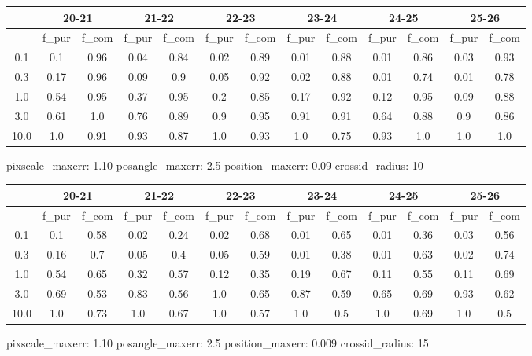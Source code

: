 \documentclass{article}
\begin{document}
\begin{figure}[H]
\centering
\begin{tabular}{|c|c|c|c|c|c|c|c|c|c|c|c|c|}
\hline
\multicolumn{1}{|c|}{} & \multicolumn{2}{|c|}{20-21} & \multicolumn{2}{|c|}{21-22} & \multicolumn{2}{|c|}{22-23} & \multicolumn{2}{|c|}{23-24} & \multicolumn{2}{|c|}{24-25} & \multicolumn{2}{|c|}{25-26}\\
\hline \hline
 & f\_pur & f\_com & f\_pur & f\_com & f\_pur & f\_com & f\_pur & f\_com & f\_pur & f\_com & f\_pur & f\_com \\
\hline
0.1 & 0.1 & 0.96 & 0.04 & 0.84 & 0.02 & 0.89 & 0.01 & 0.88 & 0.01 & 0.86 & 0.03 & 0.93\\
\hline
0.3 & 0.17 & 0.96 & 0.09 & 0.9 & 0.05 & 0.92 & 0.02 & 0.88 & 0.01 & 0.74 & 0.01 & 0.78\\
\hline
1.0 & 0.54 & 0.95 & 0.37 & 0.95 & 0.2 & 0.85 & 0.17 & 0.92 & 0.12 & 0.95 & 0.09 & 0.88\\
\hline
3.0 & 0.61 & 1.0 & 0.76 & 0.89 & 0.9 & 0.95 & 0.91 & 0.91 & 0.64 & 0.88 & 0.9 & 0.86\\
\hline
10.0 & 1.0 & 0.91 & 0.93 & 0.87 & 1.0 & 0.93 & 1.0 & 0.75 & 0.93 & 1.0 & 1.0 & 1.0\\
\hline
\end{tabular}
\caption{pixscale\_maxerr: 1.10 posangle\_maxerr: 2.5 position\_maxerr: 0.09 crossid\_radius: 10}
\end{figure}

\begin{figure}[H]
\centering
\begin{tabular}{|c|c|c|c|c|c|c|c|c|c|c|c|c|}
\hline
\multicolumn{1}{|c|}{} & \multicolumn{2}{|c|}{20-21} & \multicolumn{2}{|c|}{21-22} & \multicolumn{2}{|c|}{22-23} & \multicolumn{2}{|c|}{23-24} & \multicolumn{2}{|c|}{24-25} & \multicolumn{2}{|c|}{25-26}\\
\hline \hline
 & f\_pur & f\_com & f\_pur & f\_com & f\_pur & f\_com & f\_pur & f\_com & f\_pur & f\_com & f\_pur & f\_com \\
\hline
0.1 & 0.1 & 0.58 & 0.02 & 0.24 & 0.02 & 0.68 & 0.01 & 0.65 & 0.01 & 0.36 & 0.03 & 0.56\\
\hline
0.3 & 0.16 & 0.7 & 0.05 & 0.4 & 0.05 & 0.59 & 0.01 & 0.38 & 0.01 & 0.63 & 0.02 & 0.74\\
\hline
1.0 & 0.54 & 0.65 & 0.32 & 0.57 & 0.12 & 0.35 & 0.19 & 0.67 & 0.11 & 0.55 & 0.11 & 0.69\\
\hline
3.0 & 0.69 & 0.53 & 0.83 & 0.56 & 1.0 & 0.65 & 0.87 & 0.59 & 0.65 & 0.69 & 0.93 & 0.62\\
\hline
10.0 & 1.0 & 0.73 & 1.0 & 0.67 & 1.0 & 0.57 & 1.0 & 0.5 & 1.0 & 0.69 & 1.0 & 0.5\\
\hline
\end{tabular}
\caption{pixscale\_maxerr: 1.10 posangle\_maxerr: 2.5 position\_maxerr: 0.009 crossid\_radius: 15}
\end{figure}
\end{document}
